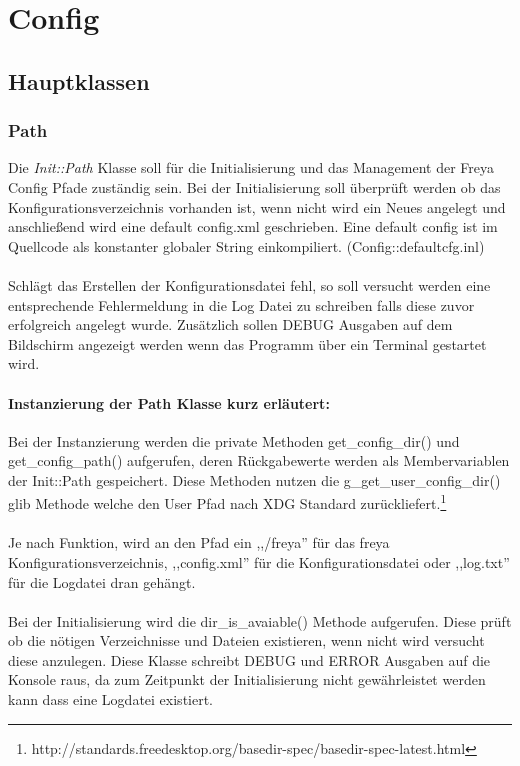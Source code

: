 \section{Config}
\subsection{Hauptklassen}


\subsubsection{Path}
Die \emph{Init::Path} Klasse soll für die Initialisierung und das Management der Freya Config Pfade zuständig sein.
Bei der Initialisierung soll überprüft werden ob das Konfigurationsverzeichnis vorhanden ist, wenn nicht wird ein Neues
angelegt und anschließend wird eine default config.xml geschrieben. Eine default config ist im Quellcode als 
 konstanter globaler String einkompiliert. (Config::defaultcfg.inl)
\\
\\
Schlägt das Erstellen der Konfigurationsdatei fehl, so soll versucht werden eine entsprechende Fehlermeldung in die Log Datei zu schreiben 
falls diese zuvor erfolgreich angelegt wurde. Zusätzlich sollen DEBUG Ausgaben auf dem Bildschirm angezeigt werden wenn das Programm
über ein Terminal gestartet wird.

\paragraph{Instanzierung der Path Klasse kurz erläutert:}
Bei der Instanzierung werden die private Methoden get\_config\_dir() und get\_config\_path() aufgerufen, deren Rückgabewerte werden
als Membervariablen der Init::Path gespeichert. Diese Methoden nutzen die g\_get\_user\_config\_dir() glib Methode
welche den User Pfad nach XDG Standard zurückliefert.\footnote{http://standards.freedesktop.org/basedir-spec/basedir-spec-latest.html}
\\
\\
Je nach Funktion, wird an den Pfad ein ,,/freya'' für das freya Konfigurationsverzeichnis, ,,config.xml''
für die Konfigurationsdatei oder ,,log.txt'' für die Logdatei dran gehängt.
\\
\\
Bei der Initialisierung wird die dir\_is\_avaiable()
Methode aufgerufen. Diese prüft ob die nötigen Verzeichnisse und Dateien existieren, wenn nicht wird versucht diese
anzulegen. Diese Klasse schreibt DEBUG und ERROR Ausgaben auf die Konsole raus, da zum Zeitpunkt der Initialisierung
nicht gewährleistet werden kann dass eine Logdatei existiert.


